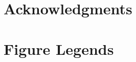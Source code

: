 \documentclass[10pt]{article}
\begin{document}
\newpage
\section{Acknowledgments}



\clearpage
\section{Figure Legends}
\end{document}
